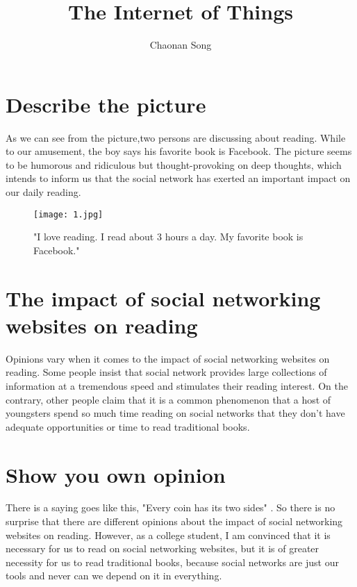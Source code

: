 \documentclass{article}
\title{The Internet of Things}
\author{Chaonan Song}
\begin{document}
\maketitle
\section{Describe the picture}
    \par As we can see from the picture,two persons are discussing about reading. While to our amusement, the boy says his favorite book is Facebook. The picture seems to be humorous and ridiculous but thought-provoking on deep thoughts, which intends to inform us that the social network has exerted an important impact on our daily reading.
\begin{figure}[H]
  \centering
  \texttt{[image: 1.jpg]}
  \caption{"I love reading. I read about 3 hours a day. My favorite book is Facebook."}
  \label{fig:1}
\end{figure}
\section{The impact of social networking websites on reading}
    \par Opinions vary when it comes to the impact of social networking  websites on reading. Some people insist that social network provides large collections of information at a tremendous speed and stimulates their reading interest. On the contrary, other people claim that it is a common phenomenon that a host of youngsters spend so much time reading on social networks that they don't have adequate opportunities or time to read traditional books.
\section{Show you own opinion}
    \par There is a saying goes like this, "Every coin has its two sides" . So there is no surprise that there are different opinions about the impact of social networking websites on reading. However, as a college student, I am convinced that it is necessary for us to read on social networking websites,  but it is of greater necessity for us to read traditional books, because social networks are just our tools and never can we depend on it in everything.
\end{document}
